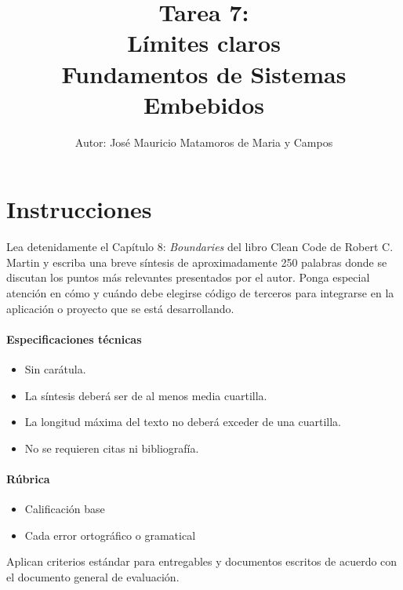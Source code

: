 \documentclass[letterpaper,10.5pt]{article}
\title{Tarea 7:\\Límites claros\\
{\large Fundamentos de Sistemas Embebidos}}
\author{\footnotesize Autor: José Mauricio Matamoros de Maria y Campos}
\date{}
\begin{document}
\maketitle
\thispagestyle{empty}


\section{Instrucciones}%
\label{sec:instructions}
Lea detenidamente el Capítulo 8: \emph{Boundaries} del libro Clean Code de Robert C. Martin y escriba una breve síntesis de aproximadamente 250 palabras donde se discutan los puntos más relevantes presentados por el autor.
Ponga especial atención en cómo y cuándo debe elegirse código de terceros para integrarse en la aplicación o proyecto que se está desarrollando.

\paragraph{Especificaciones técnicas}
\begin{itemize}
	\item Sin carátula.
	\item La síntesis deberá ser de al menos media cuartilla.
	\item La longitud máxima del texto no deberá exceder de una cuartilla.
	\item No se requieren citas ni bibliografía.
\end{itemize}

\paragraph{Rúbrica}
\begin{itemize}
	\item {} Calificación base
	\item {} Cada error ortográfico o gramatical
\end{itemize}
Aplican criterios estándar para entregables y documentos escritos de acuerdo con el documento general de evaluación.
\end{document}
